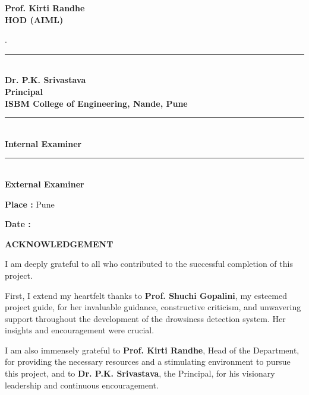 \documentclass[12pt]{article}
\begin{document}
\begin{titlepage}
\begin{minipage}[t]{0.3\textwidth}
\textbf {Prof. Kirti Randhe}\\
\textbf {HOD (AIML)}
\end{minipage}

\vspace{1.5 cm}
\begin{center}
.\begin{minipage}[t]{0.8\textwidth}
    \centering
    \rule{4.2cm}{1pt}\\
\textbf {Dr. P.K. Srivastava}\\
    \textbf {Principal}\\
\textbf{ISBM College of Engineering, Nande, Pune }
\end{minipage}
\end{center}

\vspace{1.5 cm}
\begin{minipage}[t]{0.3\textwidth}
    \centering
    \rule{4cm}{1pt}\\
\textbf {Internal Examiner}\\
\end{minipage}
\hfill
\begin{minipage}[t]{0.3\textwidth}
    \centering
    \rule{4cm}{1pt}\\
 \textbf {External Examiner}\\
\end{minipage}
\vspace{1 cm}

\textbf{Place : }
Pune

\textbf{Date :}

\end{titlepage}

\newpage
\begin{center}
\Large
\textbf{ACKNOWLEDGEMENT }\\
 \end{center}
\vspace{1cm}
\normalsize

I am deeply grateful to all who contributed to the successful completion of this project. 

First, I extend my heartfelt thanks to \textbf{Prof. Shuchi Gopalini}, my esteemed project guide, for her invaluable guidance, constructive criticism, and unwavering support throughout the development of the drowsiness detection system. Her insights and encouragement were crucial.

I am also immensely grateful to \textbf{Prof. Kirti Randhe}, Head of the Department, for providing the necessary resources and a stimulating environment to pursue this project, and to \textbf{Dr. P.K. Srivastava}, the Principal, for his visionary leadership and continuous encouragement.
\end{document}
